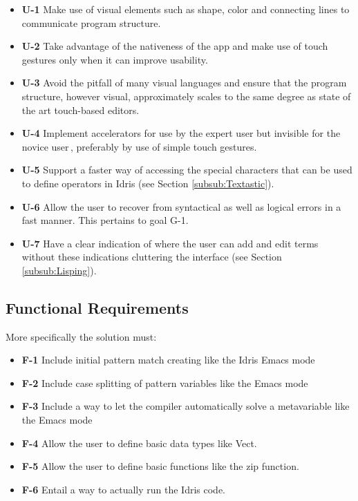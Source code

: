 \begin{itemize}     
	\item \textbf{U-1} Make use of visual elements such as shape, color and connecting lines to 
	communicate program structure.
	\item \textbf{U-2} Take advantage of the nativeness of the app and make use of touch gestures only
	when it can improve usability.
	\item \textbf{U-3} Avoid the pitfall of many visual languages\cite{green1992visual} and ensure 
	that the program structure, however visual, approximately scales to the same degree as state of 
	the art touch-based editors.
	\item \textbf{U-4} Implement accelerators for use by the expert user but invisible for the novice
	user\,\cite{nielsen1990heuristic}, preferably by use of simple touch gestures.
	\item \textbf{U-5} Support a faster way of accessing the special characters that can be used 
	to define operators in Idris (see Section \ref{subsub:Textastic}).
	\item \textbf{U-6} Allow the user to recover from syntactical as well as logical errors in a fast
	manner. This pertains to goal G-1.
	\item \textbf{U-7} Have a clear indication of where the user can add and edit terms without these
	indications cluttering the interface (see Section \ref{subsub:Lisping}).
\end{itemize}


\subsection{Functional Requirements} 
\label{subsec:FunctionalRequirements} 
More specifically the solution must:

\begin{itemize}
	\item \textbf{F-1} Include initial pattern match creating like the Idris Emacs mode \cite{Idris:EmacsMode}
	\item \textbf{F-2} Include case splitting of pattern variables like the Emacs mode \cite{Idris:EmacsMode}
	\item \textbf{F-3} Include a way to let the compiler automatically solve a metavariable like the
	Emacs mode \cite{Idris:EmacsMode}
	\item \textbf{F-4} Allow the user to define basic data types like Vect.
	\item \textbf{F-5} Allow the user to define basic functions like the zip function.
	\item \textbf{F-6} Entail a way to actually run the Idris code.
\end{itemize}

